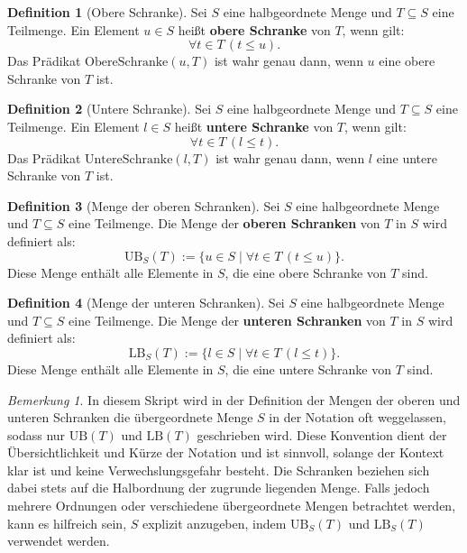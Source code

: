 \documentclass{book}
\theoremstyle{plain}
\theoremstyle{remark}
\newtheorem*{remark}{Bemerkung}
\theoremstyle{definition}
\newtheorem{definition}{Definition}[section]
\begin{document}
\begin{definition}[Obere Schranke]
    Sei \( S \) eine halbgeordnete Menge und \( T \subseteq S \) eine Teilmenge. Ein Element \( u \in S \) heißt \textbf{obere Schranke} von \( T \), wenn gilt:
    \[
    \forall t \in T \, (t \leq u).
    \]
    Das Prädikat \(\text{ObereSchranke}(u, T)\) ist wahr genau dann, wenn \( u \) eine obere Schranke von \( T \) ist.
\end{definition}

\begin{definition}[Untere Schranke]
    Sei \( S \) eine halbgeordnete Menge und \( T \subseteq S \) eine Teilmenge. Ein Element \( l \in S \) heißt \textbf{untere Schranke} von \( T \), wenn gilt:
    \[
    \forall t \in T \, (l \leq t).
    \]
    Das Prädikat \(\text{UntereSchranke}(l, T)\) ist wahr genau dann, wenn \( l \) eine untere Schranke von \( T \) ist.
\end{definition}

\begin{definition}[Menge der oberen Schranken]
    Sei \( S \) eine halbgeordnete Menge und \( T \subseteq S \) eine Teilmenge. Die Menge der \textbf{oberen Schranken} von \( T \) in \( S \) wird definiert als:
    \[
    \text{UB}_S(T) := \{ u \in S \mid \forall t \in T \, (t \leq u) \}.
    \]
    Diese Menge enthält alle Elemente in \( S \), die eine obere Schranke von \( T \) sind.
\end{definition}

\begin{definition}[Menge der unteren Schranken]
    Sei \( S \) eine halbgeordnete Menge und \( T \subseteq S \) eine Teilmenge. Die Menge der \textbf{unteren Schranken} von \( T \) in \( S \) wird definiert als:
    \[
    \text{LB}_S(T) := \{ l \in S \mid \forall t \in T \, (l \leq t) \}.
    \]
    Diese Menge enthält alle Elemente in \( S \), die eine untere Schranke von \( T \) sind.
\end{definition}
\begin{remark}
    In diesem Skript wird in der Definition der Mengen der oberen und unteren Schranken die übergeordnete Menge \( S \) in der Notation oft weggelassen, sodass nur \(\text{UB}(T)\) und \(\text{LB}(T)\) geschrieben wird. Diese Konvention dient der Übersichtlichkeit und Kürze der Notation und ist sinnvoll, solange der Kontext klar ist und keine Verwechslungsgefahr besteht. Die Schranken beziehen sich dabei stets auf die Halbordnung der zugrunde liegenden Menge. Falls jedoch mehrere Ordnungen oder verschiedene übergeordnete Mengen betrachtet werden, kann es hilfreich sein, \( S \) explizit anzugeben, indem \(\text{UB}_S(T)\) und \(\text{LB}_S(T)\) verwendet werden.
\end{remark}
\end{document}
